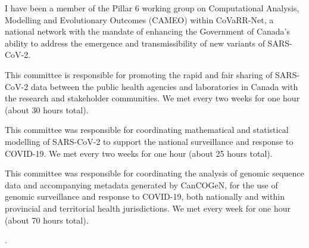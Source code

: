 
{}{}
{I have been a member of the Pillar 6 working group on Computational Analysis, Modelling and Evolutionary Outcomes (CAMEO) within CoVaRR-Net, a national network with the mandate of enhancing the Government of Canada's ability to address the emergence and transmissibility of new variants of SARS-CoV-2.}

{}{}{This committee is responsible for promoting the rapid and fair sharing of SARS-CoV-2 data between the public health agencies and laboratories in Canada with the research and stakeholder communities.  We met every two weeks for one hour (about 30 hours total).}

{}{}{This committee was responsible for coordinating mathematical and statistical modelling of SARS-CoV-2 to support the national surveillance and response to COVID-19.  We met every two weeks for one hour (about 25 hours total).}

{}{}{This committee was responsible for coordinating the analysis of genomic sequence data and accompanying metadata generated by CanCOGeN, for the use of genomic surveillance and response to COVID-19, both nationally and within provincial and territorial health jurisdictions.  We met every week for one hour (about 70 hours total).}


.





